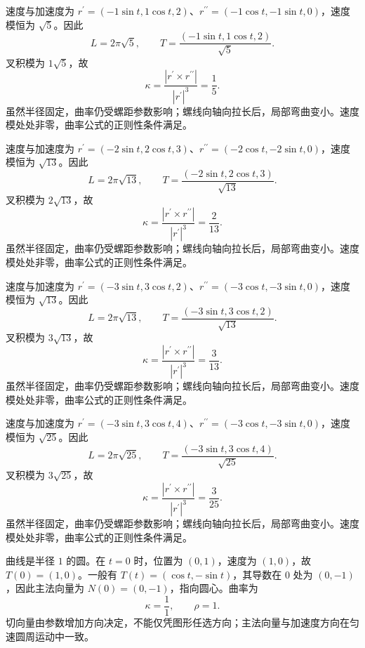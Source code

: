 \documentclass[12pt,fontset=fandol]{ctexart}
\begin{document}
\begin{solve}\label{ans:c31q15}
速度与加速度为 $r^{\prime}=(-1\sin t,1\cos t,2)$、$r^{\prime\prime}=(-1\cos t,-1\sin t,0)$，速度模恒为 $\sqrt{5}$。因此
\[
L=2\pi\sqrt{5},\qquad T=\frac{(-1\sin t,1\cos t,2)}{\sqrt{5}}.
\]
叉积模为 $1\sqrt{5}$，故
\[
\kappa=\frac{|r^{\prime}\times r^{\prime\prime}|}{|r^{\prime}|^3}=\frac{1}{5}.
\]
虽然半径固定，曲率仍受螺距参数影响；螺线向轴向拉长后，局部弯曲变小。速度模处处非零，曲率公式的正则性条件满足。
\end{solve}

\begin{solve}\label{ans:c31q16}
速度与加速度为 $r^{\prime}=(-2\sin t,2\cos t,3)$、$r^{\prime\prime}=(-2\cos t,-2\sin t,0)$，速度模恒为 $\sqrt{13}$。因此
\[
L=2\pi\sqrt{13},\qquad T=\frac{(-2\sin t,2\cos t,3)}{\sqrt{13}}.
\]
叉积模为 $2\sqrt{13}$，故
\[
\kappa=\frac{|r^{\prime}\times r^{\prime\prime}|}{|r^{\prime}|^3}=\frac{2}{13}.
\]
虽然半径固定，曲率仍受螺距参数影响；螺线向轴向拉长后，局部弯曲变小。速度模处处非零，曲率公式的正则性条件满足。
\end{solve}

\begin{solve}\label{ans:c31q17}
速度与加速度为 $r^{\prime}=(-3\sin t,3\cos t,2)$、$r^{\prime\prime}=(-3\cos t,-3\sin t,0)$，速度模恒为 $\sqrt{13}$。因此
\[
L=2\pi\sqrt{13},\qquad T=\frac{(-3\sin t,3\cos t,2)}{\sqrt{13}}.
\]
叉积模为 $3\sqrt{13}$，故
\[
\kappa=\frac{|r^{\prime}\times r^{\prime\prime}|}{|r^{\prime}|^3}=\frac{3}{13}.
\]
虽然半径固定，曲率仍受螺距参数影响；螺线向轴向拉长后，局部弯曲变小。速度模处处非零，曲率公式的正则性条件满足。
\end{solve}

\begin{solve}\label{ans:c31q18}
速度与加速度为 $r^{\prime}=(-3\sin t,3\cos t,4)$、$r^{\prime\prime}=(-3\cos t,-3\sin t,0)$，速度模恒为 $\sqrt{25}$。因此
\[
L=2\pi\sqrt{25},\qquad T=\frac{(-3\sin t,3\cos t,4)}{\sqrt{25}}.
\]
叉积模为 $3\sqrt{25}$，故
\[
\kappa=\frac{|r^{\prime}\times r^{\prime\prime}|}{|r^{\prime}|^3}=\frac{3}{25}.
\]
虽然半径固定，曲率仍受螺距参数影响；螺线向轴向拉长后，局部弯曲变小。速度模处处非零，曲率公式的正则性条件满足。
\end{solve}

\begin{solve}\label{ans:c31q19}
曲线是半径 $1$ 的圆。在 $t=0$ 时，位置为 $(0,1)$，速度为 $(1,0)$，故 $T(0)=(1,0)$。一般有 $T(t)=(\cos t,-\sin t)$，其导数在 $0$ 处为 $(0,-1)$，因此主法向量为 $N(0)=(0,-1)$，指向圆心。曲率为
\[
\kappa=\frac1{1},\qquad\rho=1.
\]
切向量由参数增加方向决定，不能仅凭图形任选方向；主法向量与加速度方向在匀速圆周运动中一致。
\end{solve}
\end{document}

